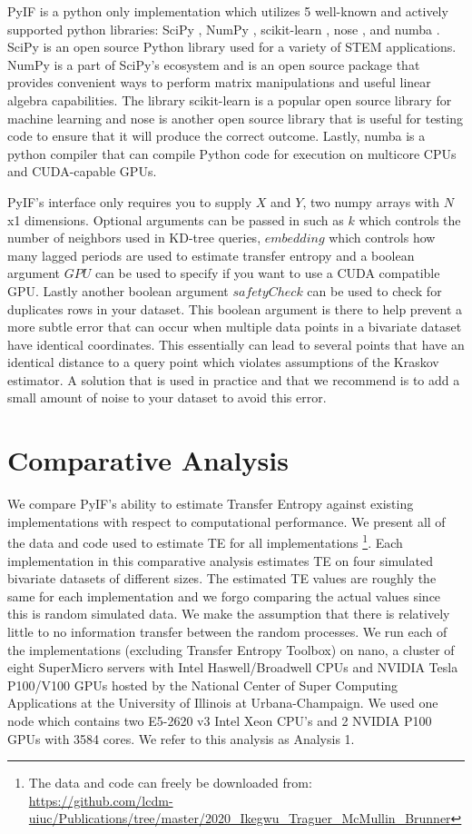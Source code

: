 \documentclass[conference]{IEEEtran}
\begin{document}
PyIF is a python only implementation which utilizes 5 well-known and actively supported python libraries: SciPy \cite{scipy}, NumPy \cite{numpy}, scikit-learn \cite{sklearn}, nose \cite{nose}, and numba \cite{numba}.  SciPy is an open source Python library used for a variety of STEM applications. NumPy  is a part of SciPy's ecosystem and is an open source package that provides convenient ways to perform matrix manipulations and useful linear algebra capabilities. The library scikit-learn is a popular open source library for machine learning and nose is another open source library that is useful for testing code to ensure that it will produce the correct outcome. Lastly, numba is a python compiler that can compile Python code for execution on multicore CPUs and CUDA-capable GPUs.

PyIF's  interface only requires you to supply \(X\) and \(Y\), two numpy arrays with \(N\)x1 dimensions. Optional arguments can be passed in such as \(k\) which controls the number of neighbors used in KD-tree queries, \(embedding\) which controls how many lagged periods are used to estimate transfer entropy and a boolean argument \(GPU\) can be used to specify if you want to use a CUDA compatible GPU. Lastly another boolean argument \(safetyCheck\) can be used to check for duplicates rows in your dataset. This boolean argument is there to help prevent a more subtle error that can occur when multiple data points in a bivariate dataset have identical coordinates. This essentially can lead to several points that have an identical distance to a query point which violates assumptions of the Kraskov estimator. A solution that is used in practice and that we recommend is to add a small amount of noise to your dataset to avoid this error.

\section{Comparative Analysis}

We compare PyIF's ability to estimate Transfer Entropy against existing implementations with respect to computational performance. We present all of the data and code used to estimate TE for all implementations \footnote{The data and code can freely be downloaded from: \\  \url{https://github.com/lcdm-uiuc/Publications/tree/master/2020\_Ikegwu\_Traguer\_McMullin\_Brunner}}. Each implementation in this comparative analysis estimates TE on four simulated bivariate datasets of different sizes. The estimated TE values are roughly the same for each implementation and we forgo comparing the actual values since this is random simulated data. We make the assumption that there is relatively little to no information transfer between the random processes. We run each of the implementations (excluding Transfer Entropy Toolbox)  on nano, a cluster of eight SuperMicro servers with Intel Haswell/Broadwell CPUs and NVIDIA Tesla P100/V100 GPUs hosted by the National Center of Super Computing Applications at the University of Illinois at Urbana-Champaign. We used one node which contains two E5-2620 v3 Intel Xeon CPU's and 2 NVIDIA P100 GPUs with 3584 cores.  We refer to this analysis as Analysis 1.
\end{document}
